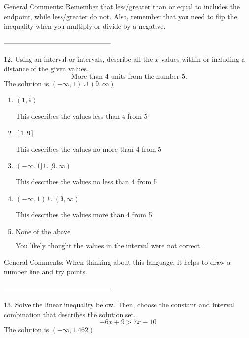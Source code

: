 \documentclass{extbook}[14pt]
\begin{document}
General Comments: Remember that less/greater than or equal to includes the endpoint, while less/greater do not. Also, remember that you need to flip the inequality when you multiply or divide by a negative.

-----------------------------------------------

12. Using an interval or intervals, describe all the $x$-values within or including a distance of the given values.
\[ \text{ More than } 4 \text{ units from the number } 5. \] 
The solution is $ (-\infty, 1) \cup (9, \infty) $ 

\begin{enumerate}[label=\Alph*.] 
\item $ (1, 9) $ 

 This describes the values less than 4 from 5 
\item $ [1, 9] $ 

 This describes the values no more than 4 from 5 
\item $ (-\infty, 1] \cup [9, \infty) $ 

 This describes the values no less than 4 from 5 
\item $ (-\infty, 1) \cup (9, \infty) $ 

 This describes the values more than 4 from 5 
\item $ \text{None of the above} $ 

 You likely thought the values in the interval were not correct. 
\end{enumerate} 
 
General Comments: When thinking about this language, it helps to draw a number line and try points.

-----------------------------------------------

13. Solve the linear inequality below. Then, choose the constant and interval combination that describes the solution set.
\[ -6x + 9 > 7x -10 \] 
The solution is $ (-\infty, 1.462) $ 
\end{document}
